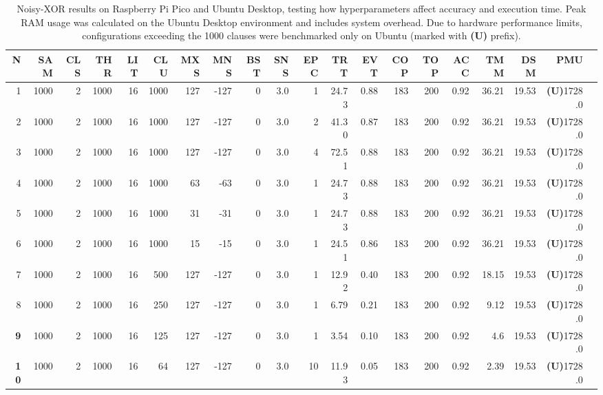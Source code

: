 \documentclass[english]{aghengthesis} %
\begin{document}
\begin{table}[!htbp]
\centering
\scriptsize
\setlength{\tabcolsep}{2.5pt}
\caption[Noisy-XOR Performance on Raspberry Pi Pico]{Noisy-XOR results on Raspberry Pi Pico and Ubuntu Desktop, testing how hyperparameters affect accuracy and execution time. Peak RAM usage was calculated on the Ubuntu Desktop environment and includes system overhead. Due to hardware performance limits, configurations exceeding the 1000 clauses were benchmarked only on Ubuntu (marked with \textbf{(U)} prefix).}
\begin{tabular}{@{}r r r r r r r r r r r r r r r r r r r r@{}} \toprule
    \textbf{N} & \textbf{SAM} & \textbf{CLS} & \textbf{THR} & \textbf{LIT} & \textbf{CLU} & \textbf{MXS} & \textbf{MNS} & \textbf{BST} & \textbf{SNS} & \textbf{EPC} & \textbf{TRT} & \textbf{EVT} & \textbf{COP} & \textbf{TOP} & \textbf{ACC} & \textbf{TMM} & \textbf{DSM} & \textbf{PMU} \\ \midrule
    1 & 1000 & 2 & 1000 & 16 & 1000 & 127 & -127 & 0 & 3.0 & 1 & 24.73 & 0.88 & 183 & 200 & 0.92 & 36.21 & 19.53 & \textbf{(U)}1728.0 \\
    2 & 1000 & 2 & 1000 & 16 & 1000 & 127 & -127 & 0 & 3.0 & 2 & 41.30 & 0.87 & 183 & 200 & 0.92 & 36.21 & 19.53 & \textbf{(U)}1728.0 \\
    3 & 1000 & 2 & 1000 & 16 & 1000 & 127 & -127 & 0 & 3.0 & 4 & 72.51 & 0.88 & 183 & 200 & 0.92 & 36.21 & 19.53 & \textbf{(U)}1728.0 \\
    4 & 1000 & 2 & 1000 & 16 & 1000 & 63 & -63 & 0 & 3.0 & 1 & 24.73 & 0.88 & 183 & 200 & 0.92 & 36.21 & 19.53 & \textbf{(U)}1728.0 \\
    5 & 1000 & 2 & 1000 & 16 & 1000 & 31 & -31 & 0 & 3.0 & 1 & 24.73 & 0.88 & 183 & 200 & 0.92 & 36.21 & 19.53 & \textbf{(U)}1728.0 \\
    6 & 1000 & 2 & 1000 & 16 & 1000 & 15 & -15 & 0 & 3.0 & 1 & 24.51 & 0.86 & 183 & 200 & 0.92 & 36.21 & 19.53 & \textbf{(U)}1728.0 \\
    7 & 1000 & 2 & 1000 & 16 & 500 & 127 & -127 & 0 & 3.0 & 1 & 12.92 & 0.40 & 183 & 200 & 0.92 & 18.15 & 19.53 & \textbf{(U)}1728.0 \\
    8 & 1000 & 2 & 1000 & 16 & 250 & 127 & -127 & 0 & 3.0 & 1 & 6.79 & 0.21 & 183 & 200 & 0.92 & 9.12 & 19.53 & \textbf{(U)}1728.0 \\
    \textbf{9} & 1000 & 2 & 1000 & 16 & 125 & 127 & -127 & 0 & 3.0 & 1 & 3.54 & 0.10 & 183 & 200 & 0.92 & 4.6 & 19.53 & \textbf{(U)}1728.0 \\
    \textbf{10} & 1000 & 2 & 1000 & 16 & 64 & 127 & -127 & 0 & 3.0 & 10 & 11.93 & 0.05 & 183 & 200 & 0.92 & 2.39 & 19.53 & \textbf{(U)}1728.0 \\

\end{tabular}
\end{table}
\end{document}
